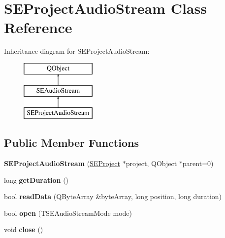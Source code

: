 \hypertarget{class_s_e_project_audio_stream}{\section{S\+E\+Project\+Audio\+Stream Class Reference}
\label{class_s_e_project_audio_stream}
}
Inheritance diagram for S\+E\+Project\+Audio\+Stream\+:\begin{figure}[H]
\begin{center}
\leavevmode
\includegraphics[height=3.000000cm]{class_s_e_project_audio_stream}
\end{center}
\end{figure}
\subsection*{Public Member Functions}
\begin{DoxyCompactItemize}
\item 
\hypertarget{class_s_e_project_audio_stream_ac653618185dafa5f040cadfc76c281fa}{{\bfseries S\+E\+Project\+Audio\+Stream} (\hyperlink{class_s_e_project}{S\+E\+Project} $\ast$project, Q\+Object $\ast$parent=0)}\label{class_s_e_project_audio_stream_ac653618185dafa5f040cadfc76c281fa}

\item 
\hypertarget{class_s_e_project_audio_stream_ad59f3e75ba6d28b6fdf35a7b56671118}{long {\bfseries get\+Duration} ()}\label{class_s_e_project_audio_stream_ad59f3e75ba6d28b6fdf35a7b56671118}

\item 
\hypertarget{class_s_e_project_audio_stream_adf20fdc6fe02c955dd512180c27018af}{bool {\bfseries read\+Data} (Q\+Byte\+Array \&byte\+Array, long position, long duration)}\label{class_s_e_project_audio_stream_adf20fdc6fe02c955dd512180c27018af}

\item 
\hypertarget{class_s_e_project_audio_stream_a2c89f777534b37424972e34cea3d0fe6}{bool {\bfseries open} (T\+S\+E\+Audio\+Stream\+Mode mode)}\label{class_s_e_project_audio_stream_a2c89f777534b37424972e34cea3d0fe6}

\item 
\hypertarget{class_s_e_project_audio_stream_a738f8d4e0313042b798a3caa0fe59ca0}{void {\bfseries close} ()}\label{class_s_e_project_audio_stream_a738f8d4e0313042b798a3caa0fe59ca0}

\end{DoxyCompactItemize}
